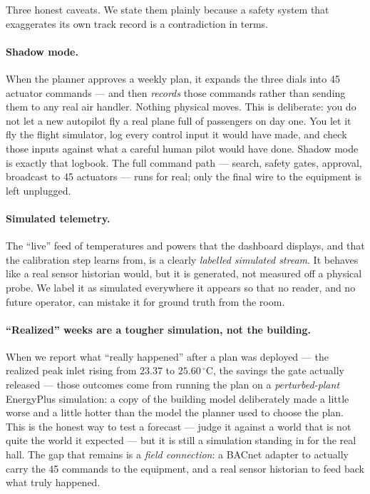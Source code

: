 \documentclass[11pt]{report}
\begin{document}
Three honest caveats. We state them plainly because a safety system that exaggerates its own track record is a contradiction in terms.

\paragraph{Shadow mode.} When the planner approves a weekly plan, it expands the three dials into 45 actuator commands --- and then \emph{records} those commands rather than sending them to any real air handler. Nothing physical moves. This is deliberate: you do not let a new autopilot fly a real plane full of passengers on day one. You let it fly the flight simulator, log every control input it would have made, and check those inputs against what a careful human pilot would have done. Shadow mode is exactly that logbook. The full command path --- search, safety gates, approval, broadcast to 45 actuators --- runs for real; only the final wire to the equipment is left unplugged.

\paragraph{Simulated telemetry.} The ``live'' feed of temperatures and powers that the dashboard displays, and that the calibration step learns from, is a clearly \emph{labelled simulated stream}. It behaves like a real sensor historian would, but it is generated, not measured off a physical probe. We label it as simulated everywhere it appears so that no reader, and no future operator, can mistake it for ground truth from the room.

\paragraph{``Realized'' weeks are a tougher simulation, not the building.} When we report what ``really happened'' after a plan was deployed --- the realized peak inlet rising from $23.37$ to $25.60\,^\circ$C, the savings the gate actually released --- those outcomes come from running the plan on a \emph{perturbed-plant} EnergyPlus simulation: a copy of the building model deliberately made a little worse and a little hotter than the model the planner used to choose the plan. This is the honest way to test a forecast --- judge it against a world that is not quite the world it expected --- but it is still a simulation standing in for the real hall. The gap that remains is a \emph{field connection}: a BACnet adapter to actually carry the 45 commands to the equipment, and a real sensor historian to feed back what truly happened.
\end{document}
